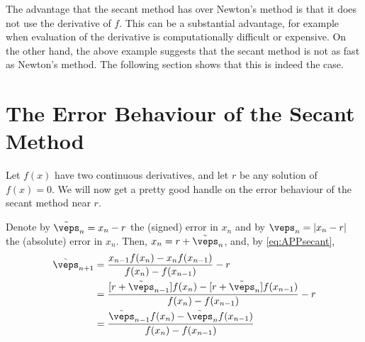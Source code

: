  
The advantage that the secant method has over Newton's method is that it does not use the derivative of $f$. This can be a substantial advantage, for example  
when  evaluation of the derivative is computationally difficult or expensive. 
On the other hand, the above example suggests that the secant method is not 
as fast as Newton's method. The following section shows that this is indeed the case.

\section{The Error Behaviour of the Secant Method}\label{sec_C_5}

Let $f(x)$ have two continuous derivatives, and let $r$ be any solution 
of $f(x)=0$. 
We will now get a pretty good handle on the error behaviour of the secant method 
near $r$.

Denote by $\tilde\veps_n=x_n-r$ the (signed) error in $x_n$ and by
$\veps_n=|x_n-r|$ the (absolute) error in $x_n$. Then, 
$x_n =r+\tilde\veps_n$, and, by \eqref{eq:APPsecant}, 
\begin{align*}
\tilde\veps_{n+1} 
         &= \frac{x_{n-1} f(x_n) - x_n f(x_{n-1}) }{f(x_n)-f(x_{n-1})} -r \\
         &= \frac{[r+\tilde\veps_{n-1}] f(x_n) - [r+\tilde\veps_n] f(x_{n-1}) }
                                            {f(x_n)-f(x_{n-1})} -r \\
         &= \frac{\tilde\veps_{n-1} f(x_n) - \tilde\veps_n f(x_{n-1}) }
                                            {f(x_n)-f(x_{n-1})}
\end{align*}


